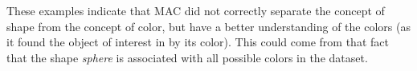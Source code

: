 These examples indicate that MAC did not correctly separate the concept of shape from the concept of color, but have a better understanding of the colors (as it found the object of interest in  by its color). This could come from that fact that the shape \textit{sphere} is associated with all possible colors in the dataset. 
